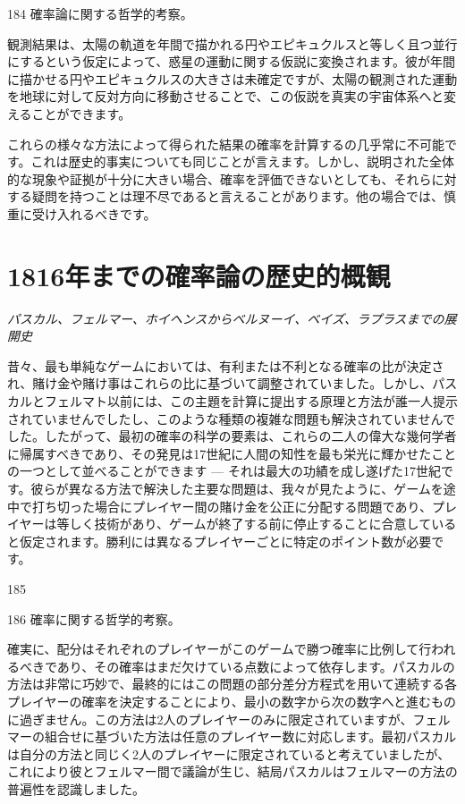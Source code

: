 \documentclass[a4paper,11pt,openany]{ltjsbook}
\begin{document}
184  確率論に関する哲学的考察。

観測結果は、太陽の軌道を年間で描かれる円やエピキュクルスと等しく且つ並行にするという仮定によって、惑星の運動に関する仮説に変換されます。彼が年間に描かせる円やエピキュクルスの大きさは未確定ですが、太陽の観測された運動を地球に対して反対方向に移動させることで、この仮説を真実の宇宙体系へと変えることができます。

これらの様々な方法によって得られた結果の確率を計算するの几乎常に不可能です。これは歴史的事実についても同じことが言えます。しかし、説明された全体的な現象や証拠が十分に大きい場合、確率を評価できないとしても、それらに対する疑問を持つことは理不尽であると言えることがあります。他の場合では、慎重に受け入れるべきです。

\newpage

\chapter{1816年までの確率論の歴史的概観}
\label{ch:xviii}

\begin{center}
\large\textit{パスカル、フェルマー、ホイヘンスからベルヌーイ、ベイズ、ラプラスまでの展開史}
\end{center}
\vspace{4mm}

昔々、最も単純なゲームにおいては、有利または不利となる確率の比が決定され、賭け金や賭け事はこれらの比に基づいて調整されていました。しかし、パスカルとフェルマト以前には、この主題を計算に提出する原理と方法が誰一人提示されていませんでしたし、このような種類の複雑な問題も解決されていませんでした。したがって、最初の確率の科学の要素は、これらの二人の偉大な幾何学者に帰属すべきであり、その発見は17世紀に人間の知性を最も栄光に輝かせたことの一つとして並べることができます — それは最大の功績を成し遂げた17世紀です。彼らが異なる方法で解決した主要な問題は、我々が見たように、ゲームを途中で打ち切った場合にプレイヤー間の賭け金を公正に分配する問題であり、プレイヤーは等しく技術があり、ゲームが終了する前に停止することに合意していると仮定されます。勝利には異なるプレイヤーごとに特定のポイント数が必要です。

185

186      確率に関する哲学的考察。

確実に、配分はそれぞれのプレイヤーがこのゲームで勝つ確率に比例して行われるべきであり、その確率はまだ欠けている点数によって依存します。パスカルの方法は非常に巧妙で、最終的にはこの問題の部分差分方程式を用いて連続する各プレイヤーの確率を決定することにより、最小の数字から次の数字へと進むものに過ぎません。この方法は2人のプレイヤーのみに限定されていますが、フェルマーの組合せに基づいた方法は任意のプレイヤー数に対応します。最初パスカルは自分の方法と同じく2人のプレイヤーに限定されていると考えていましたが、これにより彼とフェルマー間で議論が生じ、結局パスカルはフェルマーの方法の普遍性を認識しました。
\end{document}
